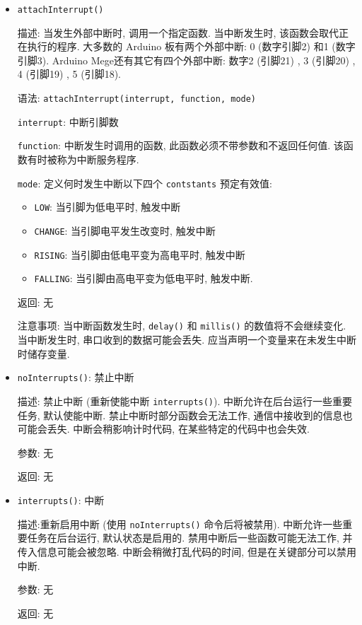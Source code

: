 \documentclass[openany, fontset=windowsold]{ctexbook}
\theoremstyle{kaiti}
\theoremstyle{normal}
\begin{document}
\begin{itemize}
  \item \verb|attachInterrupt()|

  描述: 当发生外部中断时, 调用一个指定函数. 当中断发生时, 该函数会取代正在执行的程序. 大多数的 Arduino 板有两个外部中断: 0 (数字引脚2) 和1 (数字引脚3). Arduino Mege还有其它有四个外部中断: 数字2 (引脚21) , 3 (引脚20) , 4 (引脚19) , 5 (引脚18).

  语法: \verb|attachInterrupt(interrupt, function, mode)|

  \verb|interrupt|: 中断引脚数

  \verb|function|: 中断发生时调用的函数, 此函数必须不带参数和不返回任何值. 该函数有时被称为中断服务程序.

  \verb|mode|: 定义何时发生中断以下四个 \verb|contstants| 预定有效值: 

  \begin{itemize}
    \item \verb|LOW|: 当引脚为低电平时, 触发中断

    \item \verb|CHANGE|: 当引脚电平发生改变时, 触发中断

    \item \verb|RISING|: 当引脚由低电平变为高电平时, 触发中断

    \item \verb|FALLING|: 当引脚由高电平变为低电平时, 触发中断.
  \end{itemize}

  返回: 无

  注意事项: 当中断函数发生时, \verb|delay()| 和 \verb|millis()| 的数值将不会继续变化. 当中断发生时, 串口收到的数据可能会丢失. 应当声明一个变量来在未发生中断时储存变量.

  \item \verb|noInterrupts()|: 禁止中断

  描述: 禁止中断 (重新使能中断 \verb|interrupts()|). 中断允许在后台运行一些重要任务, 默认使能中断. 禁止中断时部分函数会无法工作, 通信中接收到的信息也可能会丢失. 中断会稍影响计时代码, 在某些特定的代码中也会失效.

  参数: 无

  返回: 无

  \item \verb|interrupts()|: 中断

  描述:重新启用中断 (使用 \verb|noInterrupts()| 命令后将被禁用). 中断允许一些重要任务在后台运行, 默认状态是启用的. 禁用中断后一些函数可能无法工作, 并传入信息可能会被忽略. 中断会稍微打乱代码的时间, 但是在关键部分可以禁用中断.

  参数: 无

  返回: 无
\end{itemize}
\end{document}
